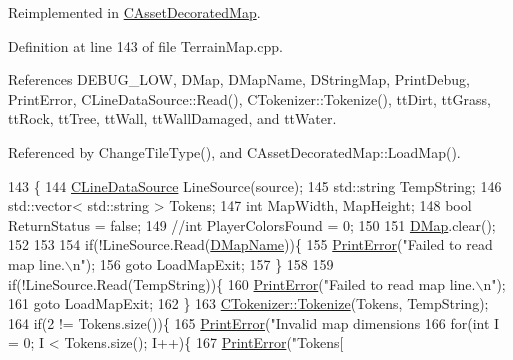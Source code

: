 Reimplemented in \hyperlink{classCAssetDecoratedMap_aaf40414c8e291bd45327787ddaf58f31}{C\+Asset\+Decorated\+Map}.



Definition at line 143 of file Terrain\+Map.\+cpp.



References D\+E\+B\+U\+G\+\_\+\+L\+OW, D\+Map, D\+Map\+Name, D\+String\+Map, Print\+Debug, Print\+Error, C\+Line\+Data\+Source\+::\+Read(), C\+Tokenizer\+::\+Tokenize(), tt\+Dirt, tt\+Grass, tt\+Rock, tt\+Tree, tt\+Wall, tt\+Wall\+Damaged, and tt\+Water.



Referenced by Change\+Tile\+Type(), and C\+Asset\+Decorated\+Map\+::\+Load\+Map().


\begin{DoxyCode}
143                                                             \{     
144     \hyperlink{classCLineDataSource}{CLineDataSource} LineSource(source);
145     std::string TempString;
146     std::vector< std::string > Tokens;
147     \textcolor{keywordtype}{int} MapWidth, MapHeight;
148     \textcolor{keywordtype}{bool} ReturnStatus = \textcolor{keyword}{false};
149     \textcolor{comment}{//int PlayerColorsFound = 0;}
150     
151     \hyperlink{classCTerrainMap_a80d154ce478948b10473534a7bca13f6}{DMap}.clear();
152     
153 
154     \textcolor{keywordflow}{if}(!LineSource.Read(\hyperlink{classCTerrainMap_a9026e4a5f073885b9e9fc3b43e93caa6}{DMapName}))\{
155         \hyperlink{Debug_8h_a2ed825eefefe35baf59a93a8c641323d}{PrintError}(\textcolor{stringliteral}{"Failed to read map line.\(\backslash\)n"});
156         \textcolor{keywordflow}{goto} LoadMapExit;
157     \}
158     
159     \textcolor{keywordflow}{if}(!LineSource.Read(TempString))\{
160         \hyperlink{Debug_8h_a2ed825eefefe35baf59a93a8c641323d}{PrintError}(\textcolor{stringliteral}{"Failed to read map line.\(\backslash\)n"});
161         \textcolor{keywordflow}{goto} LoadMapExit;
162     \}
163     \hyperlink{classCTokenizer_a7477f6849a3d0a5154879d8622e4012c}{CTokenizer::Tokenize}(Tokens, TempString);
164     \textcolor{keywordflow}{if}(2 != Tokens.size())\{
165         \hyperlink{Debug_8h_a2ed825eefefe35baf59a93a8c641323d}{PrintError}(\textcolor{stringliteral}{"Invalid map dimensions %
166         \textcolor{keywordflow}{for}(\textcolor{keywordtype}{int} I = 0; I < Tokens.size(); I++)\{
167             \hyperlink{Debug_8h_a2ed825eefefe35baf59a93a8c641323d}{PrintError}(\textcolor{stringliteral}{"Tokens[%
}}
\end{DoxyCode}

